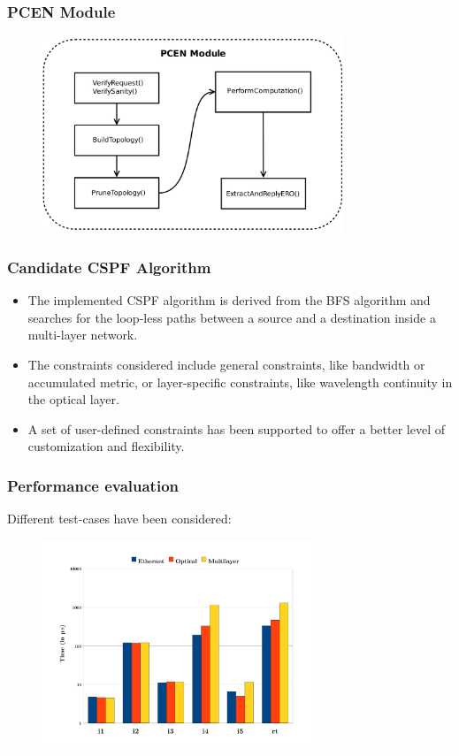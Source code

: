 \documentclass{beamer}
\begin{document}
\frame
{
  \frametitle{PCEN Module}
  
  \begin{figure}[!htbp]
    \begin{center}
      \includegraphics[width=0.8\textwidth]{img/pcen_module}
    \end{center}
  \end{figure}
}
\frame
{
  \frametitle{Candidate CSPF Algorithm}

  \begin{itemize}
  \item<1-> The implemented CSPF algorithm is derived from the BFS
    algorithm and searches for the loop-less paths between a source
    and a destination inside a multi-layer network.
  \item<2-> The constraints considered include general constraints,
    like bandwidth or accumulated metric, or layer-specific
    constraints, like wavelength continuity in the optical layer.
  \item<3-> A set of user-defined constraints has been supported to
    offer a better level of customization and flexibility.
  \end{itemize}
}
\frame
{
  \frametitle{Performance evaluation}

  Different test-cases have been considered: 

  \begin{figure}[!htbp]
    \begin{center}
      \includegraphics[width=0.72\textwidth]{img/time_graph}
    \end{center}
  \end{figure}

}
\end{document}
